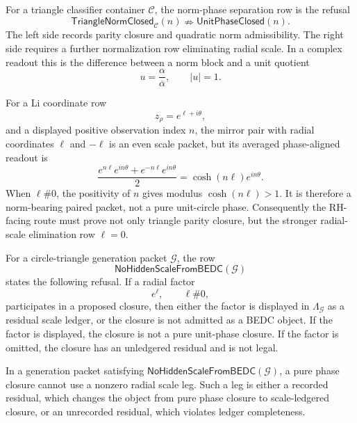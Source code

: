 \begin{definition}
\label{def:rh-norm-phase-separation-row}
For a triangle classifier container $\mathcal C$, the norm-phase
separation row is the refusal
$$
\mathsf{TriangleNormClosed}_{\mathcal C}(n)
\nRightarrow
\mathsf{UnitPhaseClosed}(n).
$$
The left side records parity closure and quadratic norm admissibility.
The right side requires a further normalization row eliminating radial
scale. In a complex readout this is the difference between a norm block
and a unit quotient
$$
u=\frac{\alpha}{\overline{\alpha}},
\qquad
|u|=1.
$$
\end{definition}

\begin{principle}
\label{prin:rh-mirror-pairing-not-unit-circle-closure}
For a Li coordinate row
$$
z_{\rho}=e^{\ell+i\theta},
$$
and a displayed positive observation index $n$, the mirror pair with
radial coordinates $\ell$ and $-\ell$ is an even scale packet, but its
averaged phase-aligned readout is
$$
\frac{e^{n\ell}e^{in\theta}+e^{-n\ell}e^{in\theta}}{2}
=
\cosh(n\ell)e^{in\theta}.
$$
When $\ell\#0$, the positivity of $n$ gives modulus
$\cosh(n\ell)>1$. It is therefore a norm-bearing paired packet, not a
pure unit-circle phase. Consequently the RH-facing route must prove not
only triangle parity closure, but the stronger radial-scale elimination
row $\ell=0$.
\end{principle}

\begin{definition}
\label{def:rh-no-hidden-scale-from-bedc-row}
For a circle-triangle generation packet $\mathcal G$, the row
$$
\mathsf{NoHiddenScaleFromBEDC}(\mathcal G)
$$
states the following refusal. If a radial factor
$$
e^{\ell},
\qquad
\ell\#0,
$$
participates in a proposed closure, then either the factor is displayed
in $\Lambda_{\mathcal G}$ as a residual scale ledger, or the closure is
not admitted as a BEDC object. If the factor is displayed, the closure is
not a pure unit-phase closure. If the factor is omitted, the closure has
an unledgered residual and is not legal.
\end{definition}

\begin{principle}
\label{prin:rh-pure-phase-closure-no-radial-leg}
In a generation packet satisfying
$\mathsf{NoHiddenScaleFromBEDC}(\mathcal G)$, a pure phase closure cannot
use a nonzero radial scale leg. Such a leg is either a recorded residual,
which changes the object from pure phase closure to scale-ledgered
closure, or an unrecorded residual, which violates ledger completeness.
\end{principle}

